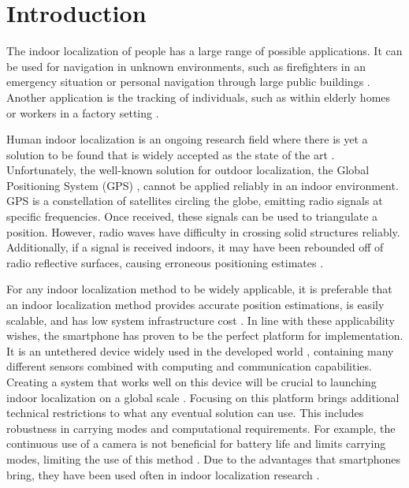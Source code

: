 
\chapter{Introduction} \label{chap:intro}

The indoor localization of people has a large range of possible applications. It can be used for navigation in unknown environments, such as firefighters in an emergency situation or personal navigation through large public buildings \cite{Correa2017, Jackermeier2018}. Another application is the tracking of individuals, such as within elderly homes or workers in a factory setting \cite{Correa2017}. \par

Human indoor localization is an ongoing research field where there is yet a solution to be found that is widely accepted as the state of the art \cite{Davidson2017}. Unfortunately, the well-known solution for outdoor localization, the Global Positioning System (GPS) \cite{Jackermeier2018}, cannot be applied reliably in an indoor environment. GPS is a constellation of satellites circling the globe, emitting radio signals at specific frequencies. Once received, these signals can be used to triangulate a position. However, radio waves have difficulty in crossing solid structures reliably. Additionally, if a signal is received indoors, it may have been rebounded off of radio reflective surfaces, causing erroneous positioning estimates \cite{Jackermeier2018}. \par 

For any indoor localization method to be widely applicable, it is preferable that an indoor localization method provides accurate position estimations, is easily scalable, and has low system infrastructure cost \cite{Correa2017}.
In line with these applicability wishes, the smartphone has proven to be the perfect platform for implementation. It is an untethered device widely used in the developed world \cite{Correa2017}, containing many different sensors combined with computing and communication capabilities.
Creating a system that works well on this device will be crucial to launching indoor localization on a global scale \cite{Gu2019}. Focusing on this platform brings additional technical restrictions to what any eventual solution can use. This includes robustness in carrying modes and computational requirements.  For example, the continuous use of a camera is not beneficial for battery life and limits carrying modes, limiting the use of this method \cite{Yang2014, Solin2018a}. Due to the advantages that smartphones bring, they have been used often in indoor localization research \cite{Jackermeier2018,Correa2017,Yang2014, Qian2013}. \par 

